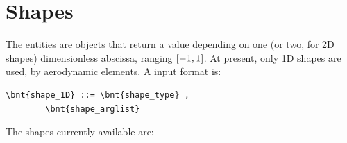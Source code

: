 \begin{enumerate}
\end{enumerate}



\section{Shapes}
\label{sec:Shape}
The  entities are objects that return a value depending on one
(or two, for 2D shapes) dimensionless abscissa, ranging $ \left[ -1,1 \right] $.
At present, only 1D shapes are used, by aerodynamic elements.
A  input format is:
\begin{Verbatim}[commandchars=\\\{\}]
    \bnt{shape_1D} ::= \bnt{shape_type} ,
        \bnt{shape_arglist}
\end{Verbatim}
The shapes currently available are:
